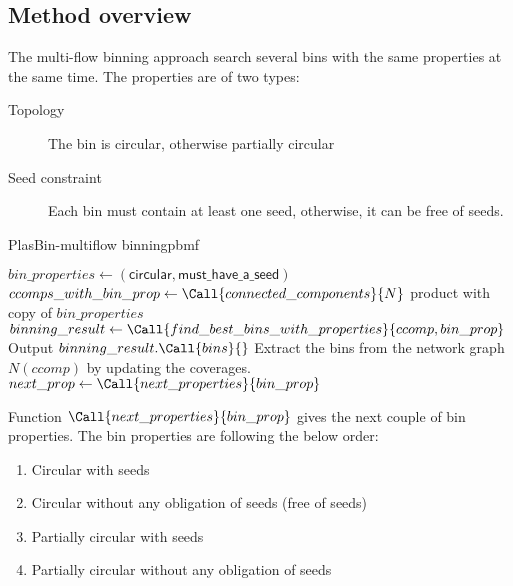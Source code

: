 \subsection{Method overview}

The multi-flow binning approach search several bins with the same properties at the same time.
The properties are of two types:
\begin{description}
  \item[Topology] The bin is circular, otherwise partially circular
  \item[Seed constraint] Each bin must contain at least one seed, otherwise, it can be free of seeds.
\end{description}

\begin{tcbalgo}{PlasBin-multiflow binning}{pbmf}
  \begin{algorithmic}[1]
    \State{} \( bin\_properties \gets (\mathsf{circular}, \mathsf{must\_have\_a\_seed}) \)
    \State{} \( ccomps\_with\_bin\_prop \gets \Call{connected\_components}{ N } \) product with copy of \( bin\_properties \)
    \State{} \( binning\_result \gets \Call{find\_best\_bins\_with\_properties}{ ccomp, bin\_prop } \)
    \State{} Output \( binning\_result.\Call{bins}{ } \)
    \State{} Extract the bins from the network graph \(N(ccomp)\) by updating the coverages.
    \State{} \( next\_prop \gets \Call{next\_properties}{ bin\_prop } \)
    \EndIf{}
    \EndIf{}
    \EndFor{}
    \EndFunction{}
  \end{algorithmic}
\end{tcbalgo}

Function \(\Call{next\_properties}{ bin\_prop }\) gives the next couple of bin properties.
The bin properties are following the below order:
\begin{enumerate}
  \item Circular with seeds
  \item Circular without any obligation of seeds (free of seeds)
  \item Partially circular with seeds
  \item Partially circular without any obligation of seeds
\end{enumerate}

